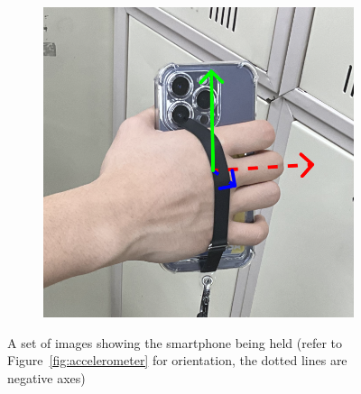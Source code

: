 \documentclass{article}
\begin{document}
\begin{figure}[ht]
\begin{subfigure}
            \label{fig:grip_2}
        \end{subfigure}%
        \begin{subfigure}
            {0.33\textwidth}
            \centering
            \includegraphics[width=\textwidth]{2_3_3_3.png}
            \label{fig:grip_3}
        \end{subfigure}
        \caption{A set of images showing the smartphone being held (refer to Figure~\ref{fig:accelerometer}
        for orientation, the dotted lines are negative axes)}
        \label{fig:phone_grips}
    \end{figure}
\end{document}
